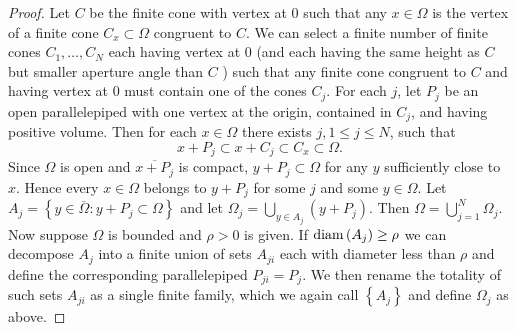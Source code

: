 \begin{proof}
  Let $C$ be the finite cone with vertex at 0 such that any $x \in \Omega$ is the vertex of a finite cone $C_x \subset \Omega$ congruent to $C$. We can select a finite number of finite cones $C_1, \ldots, C_N$ each having vertex at 0 (and each having the same height as $C$ but smaller aperture angle than $C$ ) such that any finite cone congruent to $C$ and having vertex at 0 must contain one of the cones $C_j$. For each $j$, let $P_j$ be an open parallelepiped with one vertex at the origin, contained in $C_j$, and having positive volume. Then for each $x \in \Omega$ there exists $j, 1 \leq j \leq N$, such that
  \[
  x+P_j \subset x+C_j \subset C_x \subset \Omega .
  \]
  Since $\Omega$ is open and $\overline{x+P_j}$ is compact, $y+P_j \subset \Omega$ for any $y$ sufficiently close to $x$. Hence every $x \in \Omega$ belongs to $y+P_j$ for some $j$ and some $y \in \Omega$. Let $A_j=\left\{y \in \overline{\Omega}: y+P_j \subset \Omega\right\}$ and let $\Omega_j=\bigcup_{y \in A_j}\left(y+P_j\right)$. Then $\Omega=\bigcup_{j=1}^N \Omega_j$. Now suppose $\Omega$ is bounded and $\rho>0$ is given. If $\operatorname{diam}\left(A_j\right) \geq \rho$ we can decompose $A_j$ into a finite union of sets $A_{j i}$ each with diameter less than $\rho$ and define the corresponding parallelepiped $P_{j i}=P_j$. We then rename the totality of such sets $A_{j i}$ as a single finite family, which we again call $\left\{A_j\right\}$ and define $\Omega_j$ as above.
  

\end{proof}
